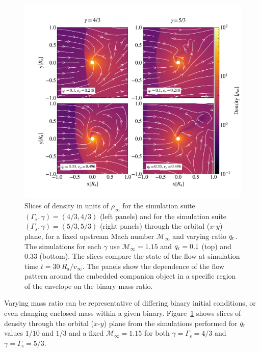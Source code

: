 \begin{figure}
\centering
\includegraphics[width=16cm]{figures/common_envelope/sliceplot_gamma_43_53_mach1pt15_varyq_gradient_comparison_figure_z.png}
\caption{Slices of density in units of $\rho_\infty$ for the simulation suite $(\Gamma_s, \gamma) = (4/3, 4/3)$ (left panels) and for the simulation suite $(\Gamma_s, \gamma) = (5/3, 5/3)$ (right panels) through the orbital ($x$-$y$) plane, for a fixed upstream Mach number $\mathcal{M}_\infty$ and varying ratio $q_{\rm r}$. The simulations for each $\gamma$ use $\mathcal{M}_\infty = 1.15$ and $q_{\rm r}=0.1$ (top) and 0.33 (bottom). The slices compare the state of the flow at simulation time $t = 30~R_{\mathrm{a}}/v_\infty$. The panels show the dependence of the flow pattern around the embedded companion object in a specific region of the envelope on the binary mass ratio. \label{fig:sims_fix_mach_vary_q}}
\vspace*{8mm}
\end{figure}

Varying mass ratio can be representative of differing binary initial conditions, or even changing enclosed mass within a given binary.  
Figure~\ref{fig:sims_fix_mach_vary_q} shows slices of density  through the orbital ($x$-$y$) plane from the simulations performed for $q_{\rm r}$ values $1/10$ and $1/3$ and a fixed $\mathcal{M}_\infty = 1.15$ for both $\gamma=\Gamma_{\mathrm s}=4/3$ and $\gamma=\Gamma_{\mathrm s}=5/3$.


